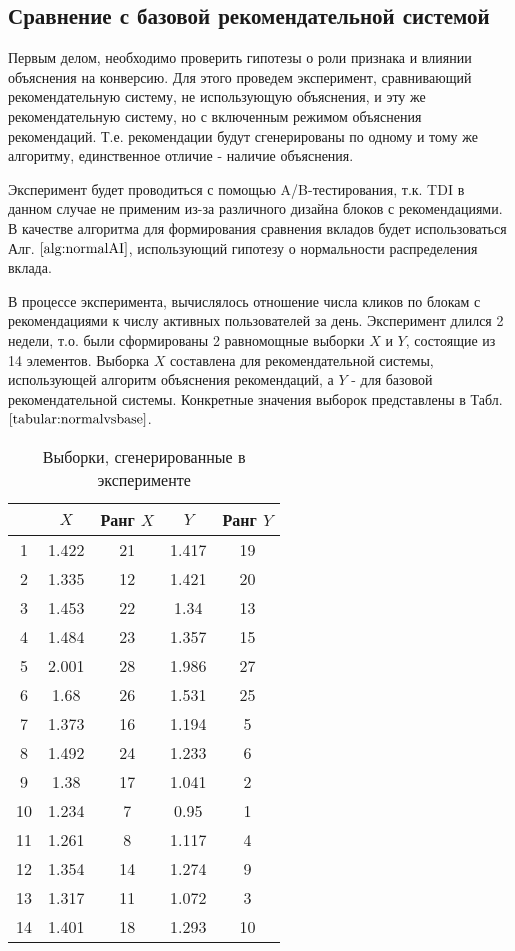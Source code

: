 \documentclass[12pt,a4paper]{report}
\begin{document}
\subsection{Сравнение с базовой рекомендательной системой}
Первым делом, необходимо проверить гипотезы о роли признака и влиянии объяснения на конверсию. Для этого проведем эксперимент, сравнивающий рекомендательную систему, не использующую объяснения, и эту же рекомендательную систему, но с включенным режимом объяснения рекомендаций. Т.е. рекомендации будут сгенерированы по одному и тому же алгоритму, единственное отличие - наличие объяснения.

Эксперимент будет проводиться с помощью A/B-тестирования, т.к. TDI в данном случае не применим из-за различного дизайна блоков с рекомендациями. В качестве алгоритма для формирования сравнения вкладов будет использоваться Алг. $\ref{alg:normalAI}$, использующий гипотезу о нормальности распределения вклада.

В процессе эксперимента, вычислялось отношение числа кликов по блокам с рекомендациями к числу активных пользователей за день. Эксперимент длился 2 недели, т.о. были сформированы 2 равномощные выборки $X$ и $Y$, состоящие из 14 элементов. Выборка $X$ составлена  для рекомендательной системы, использующей алгоритм объяснения рекомендаций, а $Y$ - для базовой рекомендательной системы. Конкретные значения выборок представлены в Табл. $\ref{tabular:normalvsbase}$.

\begin{table} [H]
\label{tabular:normalvsbase}
\begin{center}
\begin{tabular}{|c|c|c|c|c|}
\hline
 & $X$ & Ранг $X$ & $Y$ & Ранг $Y$   \\
\hline
1&1.422&21&1.417&19\\
\hline
2&1.335&12&1.421&20\\
\hline
3&1.453&22&1.34&13\\
\hline
4&1.484&23&1.357&15\\
\hline
5&2.001&28&1.986&27\\
\hline
6&1.68&26&1.531&25\\
\hline
7&1.373&16&1.194&5\\
\hline
8&1.492&24&1.233&6\\
\hline
9&1.38&17&1.041&2\\
\hline
10&1.234&7&0.95&1\\
\hline
11&1.261&8&1.117&4\\
\hline
12&1.354&14&1.274&9\\
\hline
13&1.317&11&1.072&3\\
\hline
14&1.401&18&1.293&10\\
\hline
\end{tabular}
\end{center}
\caption{Выборки, сгенерированные в эксперименте}
\end{table}
\end{document}
